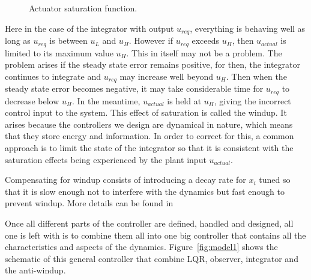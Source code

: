 \documentclass[12pt]{iopart}
\begin{document}
\begin{figure}
	\centering
{}
\caption{Actuator saturation function.}
\label{fig:saturation}
\end{figure}

Here in the case of the integrator with output $u_{req}$, everything is behaving well as long as $u_{req}$ is between $u_L$ and $u_H$. However if $u_{req}$ exceeds $u_H$, then $u_{actual}$ is limited to its maximum value $u_H$. This in itself may not be a problem. The problem arises if the steady state error remains positive, for then, the integrator continues to integrate and $u_{req}$ may increase well beyond $u_H$. Then when the steady state error becomes negative, it may take considerable time for $u_{req}$ to decrease below $u_H$. In the meantime, $u_{actual}$ is held at $u_H$, giving the incorrect control input to the system.
This effect of saturation is called the windup. It arises because the controllers we design are dynamical in nature, which means that they store energy and information. In order to correct for this, a common approach is to limit the state of the integrator so that it is consistent with the saturation effects being experienced by the plant input $u_{actual}$.

Compensating for windup consists of introducing a decay rate for $x_i$ tuned so that it is slow enough not to interfere with the dynamics but fast enough to prevent windup.
More details can be found in \cite{Lewis}

Once all different parts of the controller are defined, handled and designed, all one is left with is to combine them all into one big controller that contains all the characteristics and aspects of the dynamics.
Figure~\ref{fig:model1} shows the schematic of this general controller that combine LQR, observer, integrator and the anti-windup.
\end{document}
